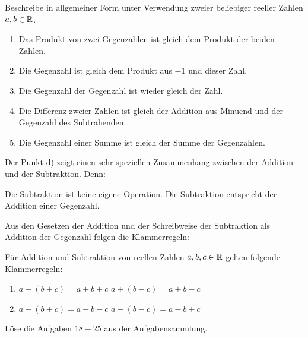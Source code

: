\documentclass[11pt,oneside]{article}
\begin{document}
    \begin{beispiel}
    	Beschreibe in allgemeiner Form unter Verwendung zweier beliebiger reeller Zahlen $a,b\in\mathbb{R}$.
    	\begin{enumerate}[label=\alph*)]
    		\item Das Produkt von zwei Gegenzahlen ist gleich dem Produkt der beiden Zahlen.\\[5pt]
    		\item Die Gegenzahl ist gleich dem Produkt aus $ -1 $ und dieser Zahl.\\[5pt]
    		\item Die Gegenzahl der Gegenzahl ist wieder gleich der Zahl.\\[5pt]
    		\item Die Differenz zweier Zahlen ist gleich der Addition aus Minuend und der Gegenzahl des Subtrahenden.\\[5pt]
    		\item Die Gegenzahl einer Summe ist gleich der Summe der Gegenzahlen.\\[5pt]
    	\end{enumerate}
    \end{beispiel}
    Der Punkt d) zeigt einen sehr speziellen Zusammenhang zwischen der Addition und der Subtraktion. Denn:
    \begin{satz}
        Die Subtraktion ist keine eigene Operation. Die Subtraktion entspricht der Addition einer Gegenzahl.
    \end{satz}
    Aus den Gesetzen der Addition und der Schreibweise der Subtraktion als Addition der Gegenzahl folgen die Klammerregeln:
    \begin{satz}
    	Für Addition und Subtraktion von reellen Zahlen $a,b,c\in\mathbb{R}$ gelten folgende Klammerregeln:
    	\begin{enumerate}
    		\item $a+(b+c) = a+b+c$ \quad {} \quad $a+(b-c) = a+b-c$
    		\item $a-(b+c) = a-b-c$ \quad {} \quad $a-(b-c) = a-b+c$
    	\end{enumerate}
    \end{satz}
    \begin{aufgabe}
        Löse die Aufgaben $18-25$ aus der Aufgabensammlung.\footnotemark
    \end{aufgabe}
\end{document}
